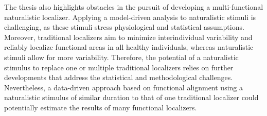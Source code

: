 The thesis also highlights obstacles in the pursuit of developing a
multi-functional naturalistic localizer.
%
Applying a model-driven analysis to naturalistic stimuli is challenging, as
these stimuli stress physiological and statistical assumptions.
%
Moreover, traditional localizers aim to minimize interindividual variability
and reliably localize functional areas in all healthy individuals, whereas
naturalistic stimuli allow for more variability.
Therefore, the potential of a naturalistic stimulus to replace one or multiple
traditional localizers relies on further developments that address the
statistical and methodological challenges.
%
Nevertheless, a data-driven approach based on functional alignment using a
naturalistic stimulus of similar duration to that of one traditional localizer
could potentially estimate the results of many functional localizers.
